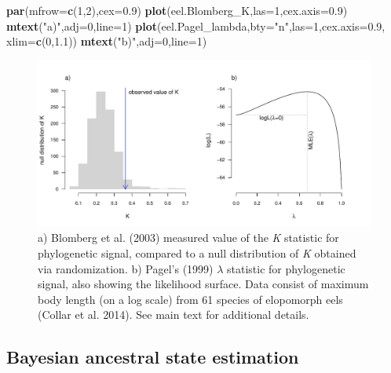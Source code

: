 \documentclass[fleqn,10pt,lineno]{wlpeerj} %
\newenvironment{Shaded}{\begin{snugshade}}{\end{snugshade}}
\newcommand{\AttributeTok}[1]{\textcolor[rgb]{0.13,0.29,0.53}{#1}}
\newcommand{\DecValTok}[1]{\textcolor[rgb]{0.00,0.00,0.81}{#1}}
\newcommand{\FloatTok}[1]{\textcolor[rgb]{0.00,0.00,0.81}{#1}}
\newcommand{\FunctionTok}[1]{\textcolor[rgb]{0.13,0.29,0.53}{\textbf{#1}}}
\newcommand{\NormalTok}[1]{#1}
\newcommand{\StringTok}[1]{\textcolor[rgb]{0.31,0.60,0.02}{#1}}
\begin{document}
\begin{Shaded}
\begin{Highlighting}[]
\FunctionTok{par}\NormalTok{(}\AttributeTok{mfrow=}\FunctionTok{c}\NormalTok{(}\DecValTok{1}\NormalTok{,}\DecValTok{2}\NormalTok{),}\AttributeTok{cex=}\FloatTok{0.9}\NormalTok{)}
\FunctionTok{plot}\NormalTok{(eel.Blomberg\_K,}\AttributeTok{las=}\DecValTok{1}\NormalTok{,}\AttributeTok{cex.axis=}\FloatTok{0.9}\NormalTok{)}
\FunctionTok{mtext}\NormalTok{(}\StringTok{"a)"}\NormalTok{,}\AttributeTok{adj=}\DecValTok{0}\NormalTok{,}\AttributeTok{line=}\DecValTok{1}\NormalTok{)}
\FunctionTok{plot}\NormalTok{(eel.Pagel\_lambda,}\AttributeTok{bty=}\StringTok{"n"}\NormalTok{,}\AttributeTok{las=}\DecValTok{1}\NormalTok{,}\AttributeTok{cex.axis=}\FloatTok{0.9}\NormalTok{,}
  \AttributeTok{xlim=}\FunctionTok{c}\NormalTok{(}\DecValTok{0}\NormalTok{,}\FloatTok{1.1}\NormalTok{))}
\FunctionTok{mtext}\NormalTok{(}\StringTok{"b)"}\NormalTok{,}\AttributeTok{adj=}\DecValTok{0}\NormalTok{,}\AttributeTok{line=}\DecValTok{1}\NormalTok{)}
\end{Highlighting}
\end{Shaded}

\begin{figure}
\includegraphics[width=1\linewidth]{Revell.phytools-v2_peerj_files/figure-latex/fig10-phylosig-1} \caption{a) Blomberg et al. (2003) measured value of the \textit{K} statistic for phylogenetic signal, compared to a null distribution of \textit{K} obtained via randomization. b) Pagel's (1999) $\lambda$ statistic for phylogenetic signal, also showing the likelihood surface. Data consist of maximum body length (on a log scale) from 61 species of elopomorph eels (Collar et al. 2014). See main text for additional details.}\label{fig:fig10-phylosig}
\end{figure}

\hypertarget{bayesian-ancestral-state-estimation}{%
\subsection{Bayesian ancestral state estimation}\label{bayesian-ancestral-state-estimation}}
\end{document}
